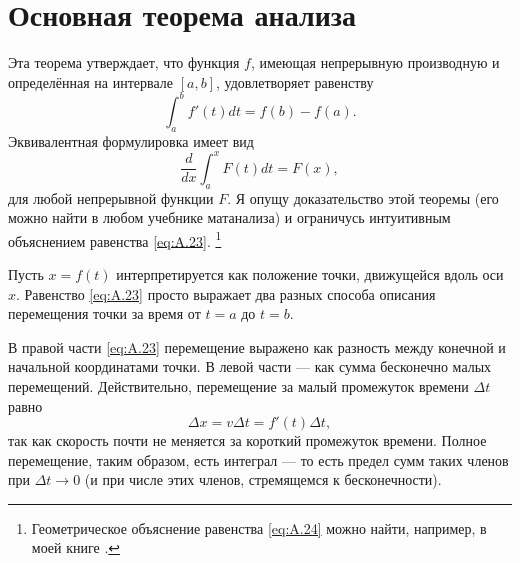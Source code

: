 \section{Основная теорема анализа}\label{Основная теорема анализа}

Эта теорема утверждает, что функция $f$, имеющая непрерывную производную и определённая на интервале $[a,b]$, удовлетворяет равенству
\begin{equation}
\int_a^b f'(t)dt=f(b)-f(a).
\label{eq:A.23}
\end{equation}
Эквивалентная формулировка имеет вид
\begin{equation}
\frac{d}{dx} \int_a^x F(t)dt=F(x),
\label{eq:A.24}
\end{equation}
для любой непрерывной функции $F$.
Я опущу доказательство этой теоремы (его можно найти в любом учебнике матанализа) и ограничусь интуитивным объяснением равенства \eqref{eq:A.23}.%
\footnote{Геометрическое объяснение равенства \eqref{eq:A.24} можно найти, например, в моей книге \cite{levi2009}.}

Пусть $x=f(t)$ интерпретируется как положение точки, движущейся вдоль оси $x$.
Равенство \eqref{eq:A.23} просто выражает два разных способа описания перемещения точки за время от $t=a$ до $t=b$.

В правой части \eqref{eq:A.23} перемещение выражено как разность между конечной и начальной координатами точки.
В левой части --- как сумма бесконечно малых перемещений.
Действительно, перемещение за малый промежуток времени $\Delta t$ равно
\[\Delta x=v\Delta t=f'(t)\Delta t,\]
так как скорость почти не меняется за короткий промежуток времени.
Полное перемещение, таким образом, есть интеграл --- то есть предел сумм таких членов при $\Delta t\to0$ (и при числе этих членов, стремящемся к бесконечности).
